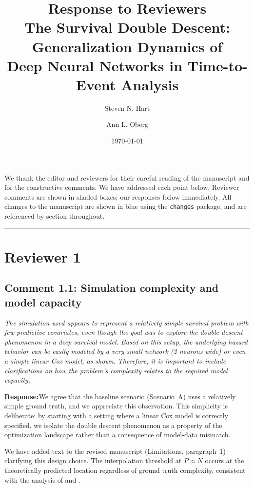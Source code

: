 \documentclass[12pt,a4paper]{article}
\title{Response to Reviewers\\[0.5em]
\large The Survival Double Descent: Generalization Dynamics of\\
Deep Neural Networks in Time-to-Event Analysis}
\author{Steven N. Hart \and Ann L. Oberg}
\date{\today}
\newcommand{\comment}[1]{%
  \begin{reviewerbox}
    \textit{#1}
  \end{reviewerbox}
}
\newcommand{\response}{\noindent\textbf{Response:}\quad}
\begin{document}
\maketitle

\noindent We thank the editor and reviewers for their careful reading of the
manuscript and for the constructive comments. We have addressed each point
below. Reviewer comments are shown in shaded boxes; our responses follow
immediately. All changes to the manuscript are shown in {\color{blue}blue}
using the \texttt{changes} package, and are referenced by section throughout.

\bigskip
\hrule
\bigskip

\section*{Reviewer 1}

\subsection*{Comment 1.1: Simulation complexity and model capacity}

\comment{The simulation used appears to represent a relatively simple survival problem with few predictive covariates, even though the goal was to explore the double descent phenomenon in a deep survival model. Based on this setup, the underlying hazard behavior can be easily modeled by a very small network (2 neurons wide) or even a simple linear Cox model, as shown. Therefore, it is important to include clarifications on how the problem's complexity relates to the required model capacity.}

\response We agree that the baseline scenario (Scenario~A) uses a relatively
simple ground truth, and we appreciate this observation. This simplicity is
deliberate: by starting with a setting where a linear Cox model is correctly
specified, we isolate the double descent phenomenon as a property of the
optimization landscape rather than a consequence of model-data mismatch.

We have added text to the revised manuscript (Limitations, paragraph~1)
clarifying this design choice. The interpolation threshold at $P \approx N$
occurs at the theoretically predicted location regardless of ground truth
complexity, consistent with the analysis of \citet{liu2025understanding} and
\citet{belkin2019reconciling}.
\end{document}
